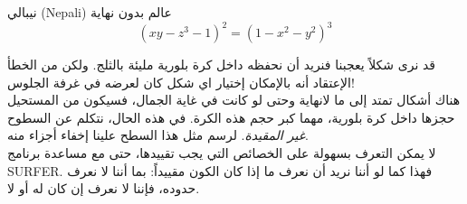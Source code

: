 \begin{surferPage}[نيبالي]{نيبالي (Nepali)}
عالم بدون نهاية \\

\smallskip
\[(x y - z^3 -1)^2= (1 - x^2 - y^2)^3\]

\singlespacing
قد نرى شكلاً يعجبنا فنريد أن نحفظه داخل كرة بلورية مليئة بالثلج. ولكن من الخطأ الإعتقاد أنه بالإمكان إختيار اي شكل كان لعرضه في غرفة الجلوس!
\\
\singlespacing
هناك أشكال تمتد إلى ما لانهاية وحتى لو كانت في غاية الجمال، فسيكون من المستحيل حجزها داخل كرة بلورية، مهما كبر حجم هذه الكرة. في هذه الحال، نتكلم عن السطوح \textit{غير المقيدة}. لرسم مثل هذا السطح علينا إخفاء أجزاء منه.
\\
\singlespacing
لا يمكن التعرف بسهولة على الخصائص التي يجب تقييدها، حتى مع مساعدة برنامج \textenglish{SURFER}. فهذا كما لو أننا نريد أن نعرف ما إذا كان الكون مقييداً: بما أننا لا نعرف حدوده، فإننا لا نعرف إن كان له أو لا.
\end{surferPage}
